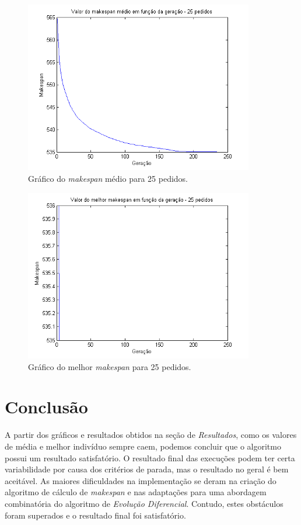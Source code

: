 \documentclass[12pt]{elsarticle}
\begin{document}
	\begin{figure}[h]
		\centering
		\includegraphics[width=10cm]{img/fit_25_medio.png}
		\caption{Gráfico do \textit{makespan} médio para 25 pedidos.}
		\label{fig:fit_25_medio}
	\end{figure}
	\begin{figure}[h]
		\centering
		\includegraphics[width=10cm]{img/fit_25_best.png}
		\caption{Gráfico do melhor \textit{makespan} para 25  pedidos.}
		\label{fig:fit_25_best}
	\end{figure}
	
	\section{Conclusão}
	A partir dos gráficos e resultados obtidos na seção de \textit{Resultados}, como os valores de média e melhor indivíduo sempre caem, podemos concluir que o algoritmo possui um resultado satisfatório. O resultado final das execuções podem ter certa variabilidade por causa dos critérios de parada, mas o resultado no geral é bem aceitável. As maiores dificuldades na implementação se deram na criação do algoritmo de cálculo de \textit{makespan} e nas adaptações para uma abordagem combinatória do algoritmo de \textit{Evolução Diferencial}. Contudo, estes obstáculos foram superados e o resultado final foi satisfatório.
	
\end{document}
